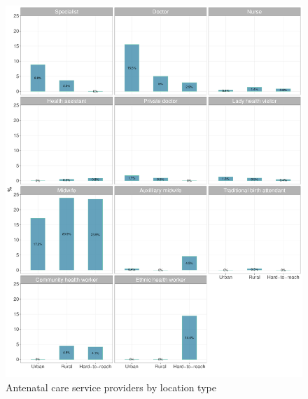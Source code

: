 \documentclass[12pt,a4paper]{article}
\begin{document}
\begin{figure}[H]

{\centering \includegraphics{kayahReport_files/figure-latex/anc1Plot-1} 

}

\caption{Antenatal care service providers by location type}\label{fig:anc1Plot}
\end{figure}
\end{document}
